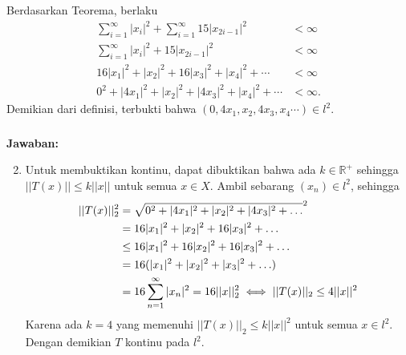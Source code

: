 \documentclass[aspectratio=169]{beamer}
\theoremstyle{definition}
\begin{document}
\begin{frame}
  \frametitle{\insertsection}
  \framesubtitle{\insertsubsection}
  Berdasarkan Teorema, berlaku
  \begin{align*}
    \sum_{i=1}^\infty|x_i|^2+\sum_{i=1}^\infty15|x_{2i-1}|^2 & <\infty  \\
    \sum_{i=1}^\infty|x_i|^2+15|x_{2i-1}|^2                  & <\infty  \\
    16|x_1|^2+|x_2|^2+16|x_3|^2+|x_4|^2+\cdots               & <\infty  \\
    0^2+|4x_1|^2+|x_2|^2+|4x_3|^2+|x_4|^2+\cdots             & <\infty.
  \end{align*}
  Demikian dari definisi, terbukti bahwa $(0,4x_1,x_2,4x_3,x_4\cdots)\in l^2.$
\end{frame}

\begin{frame}
  \frametitle{\insertsection}
  \framesubtitle{\insertsubsection}
  \textbf{Jawaban:}
  \begin{enumerate}
    \setcounter{enumi}{1}
    \item Untuk membuktikan kontinu, dapat dibuktikan bahwa ada $k \in \mathbb{R}^+$ sehingga $||T(x)||\leq k||x||$ untuk semua $x\in X$. Ambil sebarang $(x_n)\in l^2$, sehingga
          \begin{align*}
            ||T(x)||_2^2
             & =\sqrt{0^2+|4x_1|^2+|x_2|^2+|4x_3|^2+\ldots}^2 \notag                         \\
             & =16|x_1|^2+|x_2|^2+16|x_3|^2+\ldots \notag                                    \\
             & \leq 16|x_1|^2+16|x_2|^2+16|x_3|^2+\ldots \notag                              \\
             & =16(|x_1|^2+|x_2|^2+|x_3|^2+\ldots) \notag                                    \\
             & =16\sum_{n=1}^\infty|x_n|^2 =16||x||_2^2 \iff ||T(x)||_2 \leq 4||x||^2 \notag
          \end{align*}
          Karena ada $k=4$ yang memenuhi $||T(x)||_2 \leq k||x||^2$ untuk semua $x \in l^2$. Dengan demikian $T$ kontinu pada $l^2.$
  \end{enumerate}
\end{frame}
\end{document}

